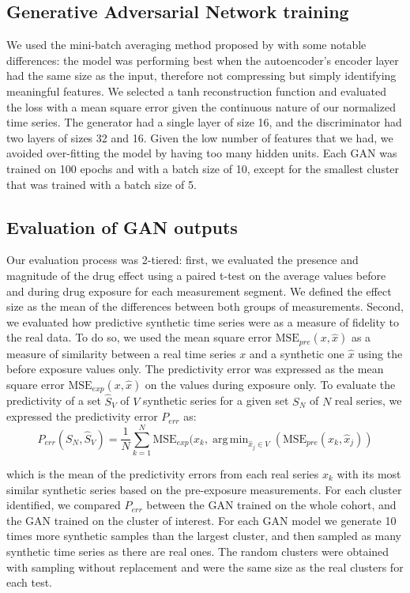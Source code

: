 \documentclass{article}
\DeclareMathOperator*{\argmin}{arg\,min}
\begin{document}
\subsection{Generative Adversarial Network training}
We used the mini-batch averaging method proposed by \citet{choi2017generating} with some notable differences: the model was performing best when the autoencoder's encoder layer had the same size as the input, therefore not compressing but simply identifying meaningful features. We selected a tanh reconstruction function and evaluated the loss with a mean square error given the continuous nature of our normalized time series. The generator had a single layer of size 16, and the discriminator had two layers of sizes 32 and 16. Given the low number of features that we had, we avoided over-fitting the model by having too many hidden units. Each GAN was trained on 100 epochs and with a batch size of 10, except for the smallest cluster that was trained with a batch size of 5.

\subsection{Evaluation of GAN outputs}

Our evaluation process was 2-tiered: first, we evaluated the presence and magnitude of the drug effect using a paired t-test on the average values before and during drug exposure for each measurement segment. We defined the effect size as the mean of the differences between both groups of measurements.
Second, we evaluated how predictive synthetic time series were as a measure of fidelity to the real data. To do so, we used the mean square error $\text{MSE}_{pre}(x,\hat{x})$ as a measure of similarity between a real time series $x$ and a synthetic one $\hat{x}$ using the before exposure values only. The predictivity error was expressed as the mean square error $\text{MSE}_{exp}(x,\hat{x})$ on the values during exposure only. To evaluate the predictivity of a set $\hat{S}_V$ of $V$ synthetic series for a given set $S_N$ of $N$ real series, we expressed the predictivity error $P_{err}$ as:
\[ P_{err}(S_N,\hat{S}_V) = \dfrac{1}{N} \sum_{k=1}^{N} \text{MSE}_{exp}(x_k,\argmin_{\hat{x}_j \in V}(\text{MSE}_{pre}(x_k,\hat{x}_j))  \]

which is the mean of the predictivity errors from each real series $x_k$ with its most similar synthetic series based on the pre-exposure measurements.
For each cluster identified, we compared  $P_{err}$ between the GAN trained on the whole cohort, and the GAN trained on the cluster of interest. For each GAN model we generate 10 times more synthetic samples than the largest cluster, and then sampled as many synthetic time series as there are real ones. The random clusters were obtained with sampling without replacement and were the same size as the real clusters for each test.
\end{document}
